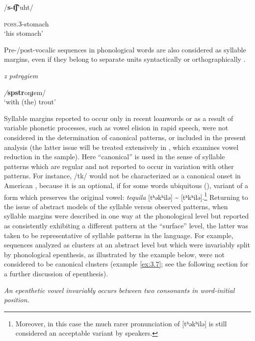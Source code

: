 \ea\label{ex:3.5}

/\textbf{s-t͡ʃ’}uht/

\textsc{poss.3}-stomach\\
\glt ‘his stomach’
\citep[24]{Polian2006}
\z

Pre-/post-vocalic sequences in phonological words are also considered as syllable margins, even if they belong to separate units syntactically or orthographically .

\ea\label{ex:3.6}

\textit{z pstrągiem}

\textit{/}\textbf{spstr}oŋɟem/\\
\glt ‘with (the) trout’
\citep[103]{Jassem2003}
\z

Syllable margins reported to occur only in recent loanwords or as a result of variable phonetic processes, such as vowel elision in rapid speech, were not considered in the determination of canonical patterns, or included in the present analysis (the latter issue will be treated extensively in , which examines vowel reduction in the sample). Here ``canonical'' is used in the sense of syllable patterns which are regular and not reported to occur in variation with other patterns. For instance, /tk/ would not be characterized as a canonical onset in American , because it is an optional, if for some words ubiquitous (\citealt{NapoleãodeSouza2019}), variant of a form which preserves the original vowel: \textit{tequila} [tʰəkʰilə] {\textasciitilde} [tʰkʰilə].\footnote{{Moreover, in this case the much rarer pronunciation of [tʰəkʰilə] is still considered an acceptable variant by speakers.}} Returning to the issue of abstract models of the syllable versus observed patterns, when syllable margins were described in one way at the phonological level but reported as consistently exhibiting a different pattern at the ``surface'' level, the latter was taken to be representative of syllable patterns in the language. For example, sequences analyzed as clusters at an abstract level but which were invariably split by phonological epenthesis, as illustrated by the  example below, were not considered to be canonical clusters (example \ref{ex:3.7}; see the following section for a further discussion of epenthesis).

\ea\label{ex:3.7}

\textit{An epenthetic vowel invariably occurs between two consonants in word-initial position.}

